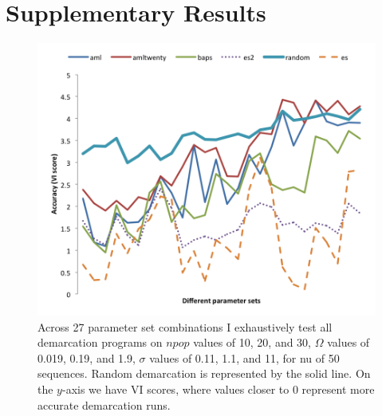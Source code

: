 \chapter{Supplementary Results}

\begin{figure}[h!]
  \centering
    \includegraphics[scale=0.75]{images/ResultGraphs/ResultGraphs-3}
      \caption[All demarcation graphical accuracy visualization on $nu = 50$.]{Across 27 parameter set combinations I exhaustively test all demarcation programs on $npop$ values of 10, 20, and 30, $\Omega$ values of 0.019, 0.19, and 1.9, $\sigma$ values of 0.11, 1.1, and 11, for nu of 50 sequences. Random demarcation is represented by the solid line. On the $y$-axis we have VI scores, where values closer to 0 represent more accurate demarcation runs.}
    \label{fig:All50}
\end{figure}

